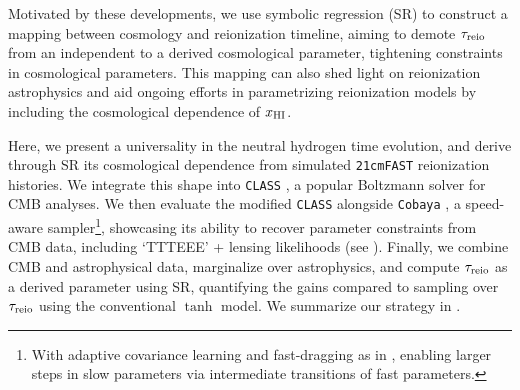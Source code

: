 Motivated by these developments, we use symbolic regression 
(SR)\cite{Cranmer2023} to construct a mapping between cosmology and
reionization timeline, aiming to demote $\tau_{\mathrm{reio}}$ from an independent
to a derived cosmological parameter, tightening constraints 
in cosmological parameters. This mapping can also
shed light on reionization astrophysics and aid ongoing efforts in 
parametrizing reionization models\cite{Trac2018,Trac2022,Paoletti2024}
by including the cosmological dependence of $x_{\mathrm{HI}}$.

Here, we present a universality in the neutral hydrogen time evolution,
and derive through SR its cosmological dependence from simulated
\texttt{21cmFAST}\cite{MesingerEtAl2011,Murray2020} reionization histories.
We integrate this shape into \texttt{CLASS} \cite{Blas2011}, a popular
Boltzmann solver for CMB analyses.
We then evaluate the modified \texttt{CLASS} alongside \texttt{Cobaya}
\cite{Torrado2020}, a speed-aware sampler\cite{Lewis2002,
Lewis2013}\footnote{With adaptive covariance learning and fast-dragging
as in \cite{Neal2005}, enabling larger steps in slow parameters via
intermediate transitions of fast parameters.}, showcasing its ability to
recover parameter constraints from CMB data, including `TTTEEE' +
lensing likelihoods\cite{Planck2020c, Planck2020d} (see ).
Finally, we combine CMB and astrophysical data, marginalize over 
astrophysics, and compute $\tau_{\mathrm{reio}}$ as
a derived parameter using SR, quantifying the gains
compared to sampling over $\tau_{\mathrm{reio}}$ using the conventional $\tanh$
model\cite{Lewis2008}.
We summarize our strategy in .

